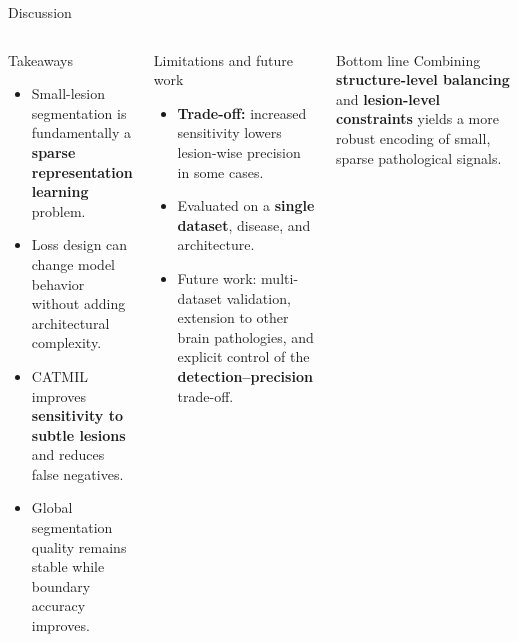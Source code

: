 \documentclass[10pt,aspectratio=169]{beamer}
\newcommand{\risk}[1]{\textbf{\color{redhi}#1}}
\begin{document}
\begin{frame}{Discussion}
\begin{columns}[T,totalwidth=\textwidth]
\begin{block}{Takeaways}
\small
\begin{itemize}
  \item Small-lesion segmentation is fundamentally a \textbf{sparse representation learning} problem.
  \item Loss design can change model behavior without adding architectural complexity.
  \item CATMIL improves \textbf{sensitivity to subtle lesions} and reduces false negatives.
  \item Global segmentation quality remains stable while boundary accuracy improves.
\end{itemize}
\end{block}

\begin{block}{Limitations and future work}
\small
\begin{itemize}
  \item \risk{Trade-off:} increased sensitivity lowers lesion-wise precision in some cases.
  \item Evaluated on a \textbf{single dataset}, disease, and architecture.
  \item Future work: multi-dataset validation, extension to other brain pathologies, and explicit control of the \textbf{detection--precision} trade-off.
\end{itemize}
\end{block}

\vspace{0.15cm}
\begin{block}{Bottom line}
\small Combining \textbf{structure-level balancing} and \textbf{lesion-level constraints} yields a more robust encoding of small, sparse pathological signals.
\end{block}
\end{columns}
\end{frame}
\end{document}
